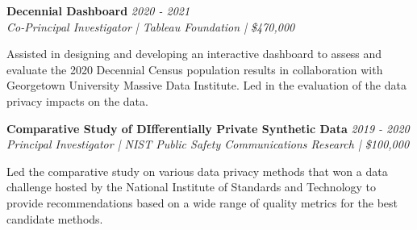 \projectspace
\textbf{Decennial Dashboard} \hfill \textit{2020 - 2021}\\
\textit{Co-Principal Investigator | Tableau Foundation | \$470,000}

Assisted in designing and developing an interactive dashboard to assess and evaluate the 2020 Decennial Census population results in collaboration with Georgetown University Massive Data Institute. Led in the evaluation of the data privacy impacts on the data.

\projectspace
\textbf{Comparative Study of DIfferentially Private Synthetic Data } \hfill \textit{2019 - 2020}\\
\textit{Principal Investigator | NIST Public Safety Communications Research | \$100,000}

Led the comparative study on various data privacy methods that won a data challenge hosted by the National Institute of Standards and Technology to provide recommendations based on a wide range of quality metrics for the best candidate methods. 